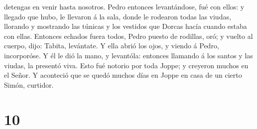 detengas en venir hasta nosotros.  Pedro entonces
levantándose, fué con ellos: y llegado que hubo, le llevaron á la sala,
donde le rodearon todas las viudas, llorando y mostrando las túnicas y
los vestidos que Dorcas hacía cuando estaba con ellas. 
Entonces echados fuera todos, Pedro puesto de rodillas, oró; y vuelto al
cuerpo, dijo: Tabita, levántate. Y ella abrió los ojos, y viendo á
Pedro, incorporóse.  Y él le dió la mano, y levantóla:
entonces llamando á los santos y las viudas, la presentó viva.
 Esto fué notorio por toda Joppe; y creyeron muchos en el
Señor.  Y aconteció que se quedó muchos días en Joppe en
casa de un cierto Simón, curtidor.

\hypertarget{section-9}{%
\section{10}\label{section-9}}

